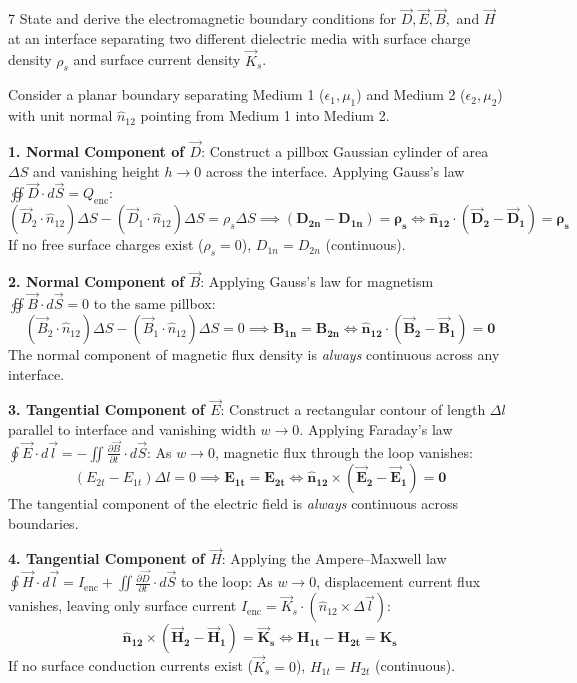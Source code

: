 \begin{theoryq}{7}
State and derive the electromagnetic boundary conditions for $\vec{D}, \vec{E}, \vec{B},$ and $\vec{H}$ at an interface separating two different dielectric media with surface charge density $\rho_s$ and surface current density $\vec{K}_s$.
\end{theoryq}
\begin{theorysol}
Consider a planar boundary separating Medium 1 ($\epsilon_1, \mu_1$) and Medium 2 ($\epsilon_2, \mu_2$) with unit normal $\hat{n}_{12}$ pointing from Medium 1 into Medium 2.

\textbf{1. Normal Component of $\vec{D}$}:
Construct a pillbox Gaussian cylinder of area $\Delta S$ and vanishing height $h \to 0$ across the interface. Applying Gauss's law $\oiint \vec{D}\cdot d\vec{S} = Q_{\text{enc}}$:
\begin{equation}
(\vec{D}_2 \cdot \hat{n}_{12})\Delta S - (\vec{D}_1 \cdot \hat{n}_{12})\Delta S = \rho_s \Delta S \implies \mathbf{(D_{2n} - D_{1n}) = \rho_s \iff \hat{n}_{12}\cdot(\vec{D}_2 - \vec{D}_1) = \rho_s}
\end{equation}
If no free surface charges exist ($\rho_s = 0$), $D_{1n} = D_{2n}$ (continuous).

\textbf{2. Normal Component of $\vec{B}$}:
Applying Gauss's law for magnetism $\oiint \vec{B}\cdot d\vec{S} = 0$ to the same pillbox:
\begin{equation}
(\vec{B}_2 \cdot \hat{n}_{12})\Delta S - (\vec{B}_1 \cdot \hat{n}_{12})\Delta S = 0 \implies \mathbf{B_{1n} = B_{2n} \iff \hat{n}_{12}\cdot(\vec{B}_2 - \vec{B}_1) = 0}
\end{equation}
The normal component of magnetic flux density is \textit{always} continuous across any interface.

\textbf{3. Tangential Component of $\vec{E}$}:
Construct a rectangular contour of length $\Delta l$ parallel to interface and vanishing width $w \to 0$. Applying Faraday's law $\oint \vec{E}\cdot d\vec{l} = -\iint \frac{\partial\vec{B}}{\partial t}\cdot d\vec{S}$:
As $w \to 0$, magnetic flux through the loop vanishes:
\begin{equation}
(E_{2t} - E_{1t})\Delta l = 0 \implies \mathbf{E_{1t} = E_{2t} \iff \hat{n}_{12}\times(\vec{E}_2 - \vec{E}_1) = 0}
\end{equation}
The tangential component of the electric field is \textit{always} continuous across boundaries.

\textbf{4. Tangential Component of $\vec{H}$}:
Applying the Ampere--Maxwell law $\oint \vec{H}\cdot d\vec{l} = I_{\text{enc}} + \iint \frac{\partial\vec{D}}{\partial t}\cdot d\vec{S}$ to the loop:
As $w \to 0$, displacement current flux vanishes, leaving only surface current $I_{\text{enc}} = \vec{K}_s \cdot (\hat{n}_{12} \times \Delta\vec{l})$:
\begin{equation}
\mathbf{\hat{n}_{12} \times (\vec{H}_2 - \vec{H}_1) = \vec{K}_s \iff H_{1t} - H_{2t} = K_s}
\end{equation}
If no surface conduction currents exist ($\vec{K}_s = 0$), $H_{1t} = H_{2t}$ (continuous).
\end{theorysol}
\vspace{4mm}

